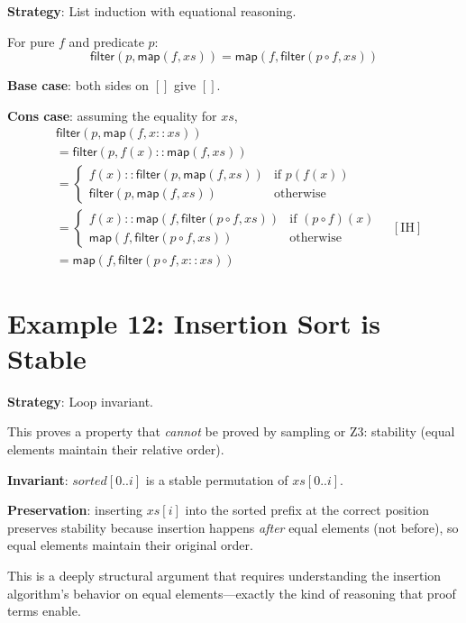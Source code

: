 \textbf{Strategy}: List induction with equational reasoning.

For pure $f$ and predicate $p$:
\[
  \mathsf{filter}(p, \mathsf{map}(f, \mathit{xs}))
  = \mathsf{map}(f, \mathsf{filter}(p \circ f, \mathit{xs}))
\]

\textbf{Base case}: both sides on $[]$ give $[]$.

\textbf{Cons case}: assuming the equality for $\mathit{xs}$,
\begin{align*}
  &\mathsf{filter}(p, \mathsf{map}(f, x::\mathit{xs})) \\
  &= \mathsf{filter}(p, f(x) :: \mathsf{map}(f, \mathit{xs})) \\
  &= \begin{cases}
    f(x) :: \mathsf{filter}(p, \mathsf{map}(f, \mathit{xs}))
      & \text{if } p(f(x)) \\
    \mathsf{filter}(p, \mathsf{map}(f, \mathit{xs}))
      & \text{otherwise}
  \end{cases} \\
  &= \begin{cases}
    f(x) :: \mathsf{map}(f, \mathsf{filter}(p \circ f, \mathit{xs}))
      & \text{if } (p \circ f)(x) \\
    \mathsf{map}(f, \mathsf{filter}(p \circ f, \mathit{xs}))
      & \text{otherwise}
  \end{cases} \quad [\text{IH}] \\
  &= \mathsf{map}(f, \mathsf{filter}(p \circ f, x::\mathit{xs}))
\end{align*}


\section{Example 12: Insertion Sort is Stable}

\textbf{Strategy}: Loop invariant.

This proves a property that \emph{cannot} be proved by sampling or Z3:
stability (equal elements maintain their relative order).

\textbf{Invariant}: $\mathit{sorted}[0..i]$ is a stable permutation
of $\mathit{xs}[0..i]$.

\textbf{Preservation}: inserting $\mathit{xs}[i]$ into the sorted
prefix at the correct position preserves stability because insertion
happens \emph{after} equal elements (not before), so equal elements
maintain their original order.

This is a deeply structural argument that requires understanding the
insertion algorithm's behavior on equal elements---exactly the kind
of reasoning that proof terms enable.


